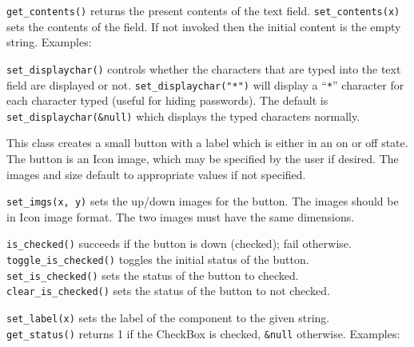 \texttt{get\_contents()} returns the present contents of the text field.
\texttt{set\_contents(x)} sets the contents of the field. If not invoked then
the initial content is the empty string. Examples:


\texttt{set\_displaychar()} controls whether the characters that are typed
into the text field are displayed or not. \texttt{set\_displaychar("*")}
will display a ``\texttt{*}'' character for each character typed (useful
for hiding passwords). The default is \texttt{set\_displaychar(\&null)}
which displays the typed characters normally.


This class creates a small button with a label which is either
in an on or off state. The button is an Icon image, which may be
specified by the user if desired. The images and size default to
appropriate values if not specified.

\texttt{set\_imgs(x, y)} sets the up/down images for the button. The images
should be in Icon image format. The two images must have the same
dimensions.

\texttt{is\_checked()} succeeds if the button is down (checked); fail
otherwise.\\
\texttt{toggle\_is\_checked()} toggles the initial status of the button.\\
\texttt{set\_is\_checked()} sets the status of the button to checked.\\
\texttt{clear\_is\_checked()} sets the status of the button to not checked.

\texttt{set\_label(x)} sets the label of the component to the given
string.\\
\texttt{get\_status()} returns 1 if the CheckBox is checked,
\texttt{\&null} otherwise.
Examples:


